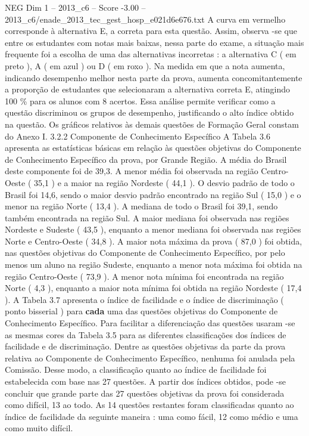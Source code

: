 \begin{textsample}{NEG Dim 1 – 2013\_c6 – Score -3.00 – 2013\_c6/enade\_2013\_tec\_gest\_hosp\_e021d6e676.txt}
A curva em vermelho corresponde à alternativa E, a correta para esta questão.
Assim, observa -se que entre os estudantes com notas mais baixas, nessa parte do exame, a situação mais frequente foi a escolha de uma das alternativas incorretas : a alternativa C ( em preto ), A ( em azul ) ou D ( em roxo ).
Na medida em que a nota aumenta, indicando desempenho melhor nesta parte da prova, aumenta concomitantemente a proporção de estudantes que selecionaram a alternativa correta E, atingindo 100 \% para os alunos com 8 acertos.
Essa análise permite verificar como a questão discriminou os grupos de desempenho, justificando o alto índice obtido na questão.
Os gráficos relativos às demais questões de Formação Geral constam do Anexo I. 3.2.2 Componente de Conhecimento Específico A Tabela 3.6 apresenta as estatísticas básicas em relação às questões objetivas do Componente de Conhecimento Específico da prova, por Grande Região.
A média do Brasil deste componente foi de 39,3.
A menor média foi observada na região Centro-Oeste ( 35,1 ) e a maior na região Nordeste ( 44,1 ).
O desvio padrão de todo o Brasil foi 14,6, sendo o maior desvio padrão encontrado na região Sul ( 15,0 ) e o menor na região Norte ( 13,4 ).
A mediana de todo o Brasil foi 39,1, sendo também encontrada na região Sul.
A maior mediana foi observada nas regiões Nordeste e Sudeste ( 43,5 ), enquanto a menor mediana foi observada nas regiões Norte e Centro-Oeste ( 34,8 ).
A maior nota máxima da prova ( 87,0 ) foi obtida, nas questões objetivas do Componente de Conhecimento Específico, por pelo menos um aluno na região Sudeste, enquanto a menor nota máxima foi obtida na região Centro-Oeste ( 73,9 ).
A menor nota mínima foi encontrada na região Norte ( 4,3 ), enquanto a maior nota mínima foi obtida na região Nordeste ( 17,4 ).
A Tabela 3.7 apresenta o índice de facilidade e o índice de discriminação ( ponto bisserial ) para \textbf{cada} uma das questões objetivas do Componente de Conhecimento Específico.
Para facilitar a diferenciação das questões usaram -se as mesmas cores da Tabela 3.5 para as diferentes classificações dos índices de facilidade e de discriminação.
Dentre as questões objetivas da parte da prova relativa ao Componente de Conhecimento Específico, nenhuma foi anulada pela Comissão.
Desse modo, a classificação quanto ao índice de facilidade foi estabelecida com base nas 27 questões.
A partir dos índices obtidos, pode -se concluir que grande parte das 27 questões objetivas da prova foi considerada como difícil, 13 ao todo.
As 14 questões restantes foram classificadas quanto ao índice de facilidade da seguinte maneira : uma como fácil, 12 como médio e uma como muito difícil.

\end{textsample}
